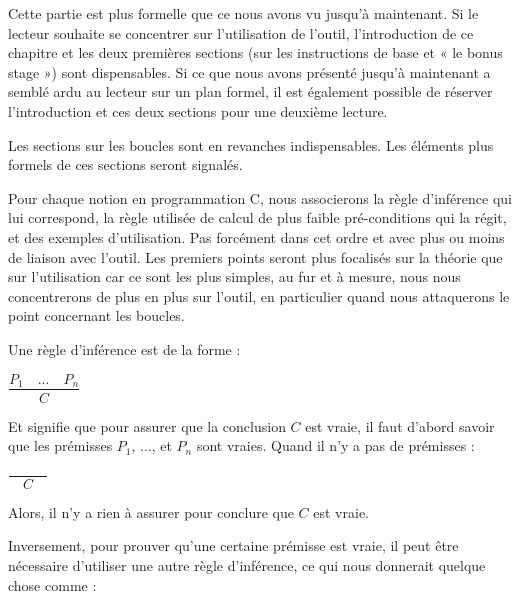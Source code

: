 

\begin{Information}
Cette partie est plus formelle que ce nous avons vu jusqu'à maintenant. Si le 
lecteur souhaite se concentrer sur l'utilisation de l'outil, l'introduction de
ce chapitre et les deux premières sections (sur les instructions de base et « le 
bonus stage ») sont dispensables. Si ce que nous avons présenté jusqu'à maintenant
a semblé ardu au lecteur sur un plan formel, il est également possible de réserver 
l'introduction et ces deux sections pour une deuxième lecture.

Les sections sur les boucles sont en revanches indispensables. Les éléments plus
formels de ces sections seront signalés.
\end{Information}


Pour chaque notion en programmation C, nous associerons la règle d'inférence qui 
lui correspond, la règle utilisée de calcul de plus faible pré-conditions qui la 
régit, et des exemples d'utilisation. Pas forcément dans cet ordre et avec plus ou 
moins de liaison avec l'outil. Les premiers points seront plus focalisés sur la
théorie que sur l'utilisation car ce sont les plus simples, au fur et à mesure,
nous nous concentrerons de plus en plus sur l'outil, en particulier quand nous 
attaquerons le point concernant les boucles.





Une règle d'inférence est de la forme :




\begin{center}
$\dfrac{P_1 \quad ... \quad P_n}{C}$


\end{center}


Et signifie que pour assurer que la conclusion $C$ est vraie, il faut d'abord
savoir que les prémisses $P_1$, ..., et $P_n$ sont vraies. Quand il n'y a
pas de prémisses :




\begin{center}
$\dfrac{}{\quad C \quad}$


\end{center}


Alors, il n'y a rien à assurer pour conclure que $C$ est vraie.



Inversement, pour prouver qu'une certaine prémisse est vraie, il peut être nécessaire 
d'utiliser une autre règle d'inférence, ce qui nous donnerait quelque
chose comme :




